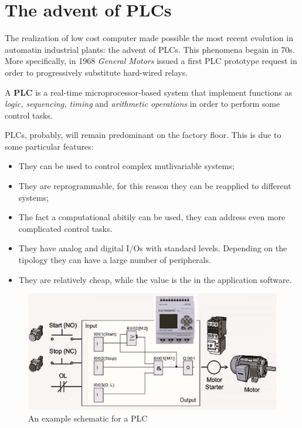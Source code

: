 \section{The advent of PLCs}
The realization of low cost computer made possible the most recent evolution in automatin industrial plants: the advent of PLCs. This phenomena begain in 70s. More specifically, in 1968 \textit{General Motors} issued a first PLC prototype request in order to progressively substitute hard-wired relays.
\begin{definition}
    A \textbf{PLC} is a real-time microprocessor-based system that implement functions as   \textit{logic, sequencing, timing} and \textit{arithmetic operations} in order to perform some control tasks.
\end{definition}

PLCs, probably, will remain predominant on the factory floor. This is due to some particular features:
\begin{itemize}
    \itemsep-0.3em
    \item They can be used to control complex mutlivariable systems; 
    \item They are reprogrammable, for this reason they can be reapplied to different systems; 
    \item The fact a computational abitily can be used, they can address even more complicated control tasks.
    \item They have analog and digital I/Os with standard levels. Depending on the tipology they can have a large number of peripherals.
    \item They are relatively cheap, while the value is the in the application software.
\end{itemize}

\begin{figure}
    \centering
    \includegraphics[scale=0.7]{img/PLC_scheme.jpg}
    \caption{An example schematic for a PLC}
\end{figure}


